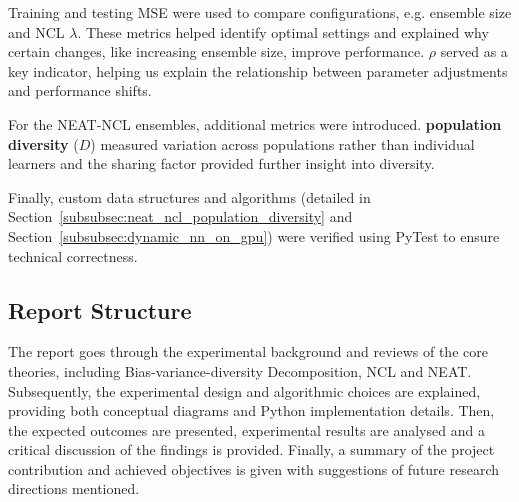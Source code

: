 Training and testing MSE were used to compare configurations, e.g. ensemble size and NCL $\lambda$. These metrics helped identify optimal settings and explained why certain changes, like increasing ensemble size, improve performance. $\rho$ served as a key indicator, helping us explain the relationship between parameter adjustments and performance shifts. 

For the NEAT-NCL ensembles, additional metrics were introduced. \textbf{population diversity} ($D$) measured variation across populations rather than individual learners and the sharing factor provided further insight into diversity. 

Finally, custom data structures and algorithms (detailed in Section~\ref{subsubsec:neat_ncl_population_diversity} and Section~\ref{subsubsec:dynamic_nn_on_gpu}) were verified using PyTest to ensure technical correctness. 


\subsection{Report Structure}
The report goes through the experimental background and reviews of the core theories, including Bias-variance-diversity Decomposition, NCL and NEAT. Subsequently, the experimental design and algorithmic choices are explained, providing both conceptual diagrams and Python implementation details. Then, the expected outcomes are presented, experimental results are analysed and a critical discussion of the findings is provided. Finally, a summary of the project contribution and achieved objectives is given with suggestions of future research directions mentioned. 